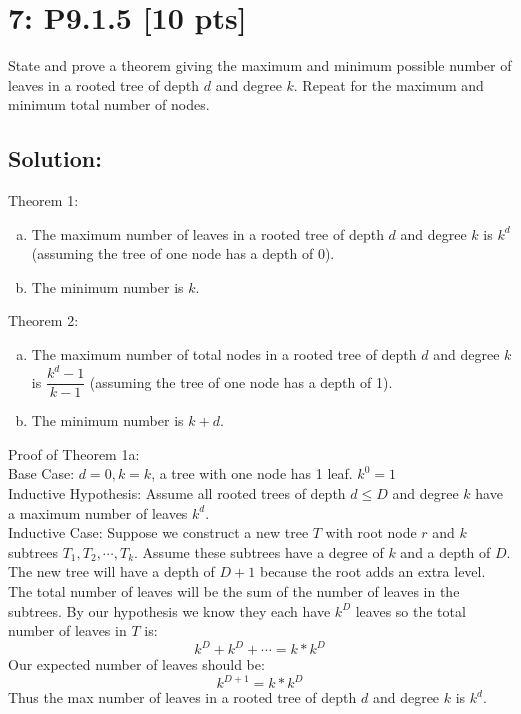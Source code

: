 \documentclass[12pt]{article}
\begin{document}
\newpage
\section*{\textbf{7: P9.1.5} [10 pts]}
State and prove a theorem giving the maximum and minimum possible number of leaves in a rooted tree of depth $d$ and degree $k$. Repeat for the maximum and minimum total number of nodes.


\subsection*{\textbf{Solution:}}
Theorem 1:
\begin{enumerate}[a.]
	\item The maximum number of leaves in a rooted tree of depth $d$ and degree $k$ is $k^d$ (assuming the tree of one node has a depth of 0).
	\item The minimum number is $k$.
\end{enumerate} 

\noindent
Theorem 2: 
\begin{enumerate}[a.]
	\item The maximum number of total nodes in a rooted tree of depth $d$ and degree $k$ is $\dfrac{k^{d}-1}{k-1}$ (assuming the tree of one node has a depth of 1).
	\item The minimum number is $k+d$.
\end{enumerate}

\noindent
Proof of Theorem 1a:\\

Base Case: $d=0, k=k$, a tree with one node has 1 leaf. $k^0 = 1$\\

Inductive Hypothesis: Assume all rooted trees of depth $d \leq D$ and degree $k$ have a maximum number of leaves $k^d$.\\

Inductive Case: Suppose we construct a new tree $T$ with root node $r$ and $k$ subtrees $T_1, T_2 ,\cdots , T_k$. Assume these subtrees have a degree of $k$ and a depth of $D$. The new tree will have a depth of $D+1$ because the root adds an extra level. The total number of leaves will be the sum of the number of leaves in the subtrees. By our hypothesis we know they each have $k^D$ leaves so the total number of leaves in $T$ is:
\[ k^D + k^D + \cdots = k*k^D\]
Our expected number of leaves should be:
\[ k^{D+1} =  k*k^D \]
Thus the max number of leaves in a rooted tree of depth $d$ and degree $k$ is $k^d$.\\
\end{document}
